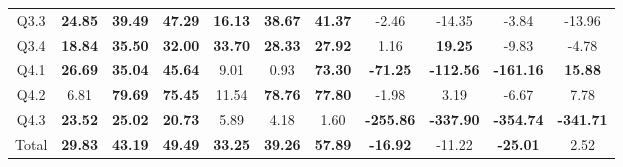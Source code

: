 \begin{table}
{\begin{tabular}{@{}ccccccccccc@{}}
    Q3.3                       & \multicolumn{1}{c}{\textbf{24.85}}            & \multicolumn{1}{c}{\textbf{39.49}}            & \textbf{47.29}            & \multicolumn{1}{c}{\textbf{16.13}}             & \multicolumn{1}{c}{\textbf{38.67}}           & \textbf{41.37}            & \multicolumn{1}{c}{-2.46}            & \multicolumn{1}{c}{-14.35}           & \multicolumn{1}{c}{-3.84}            & -13.96                          \\ 
    Q3.4                       & \multicolumn{1}{c}{\textbf{18.84}}            & \multicolumn{1}{c}{\textbf{35.50}}            & \textbf{32.00}            & \multicolumn{1}{c}{\textbf{33.70}}             & \multicolumn{1}{c}{\textbf{28.33}}           & \textbf{27.92}            & \multicolumn{1}{c}{1.16}             & \multicolumn{1}{c}{\textbf{19.25}}   & \multicolumn{1}{c}{-9.83}            & -4.78                           \\ 
    Q4.1                       & \multicolumn{1}{c}{\textbf{26.69}}            & \multicolumn{1}{c}{\textbf{35.04}}            & \textbf{45.64}            & \multicolumn{1}{c}{9.01}                       & \multicolumn{1}{c}{0.93}                     & \textbf{73.30}            & \multicolumn{1}{c}{\textbf{-71.25}}  & \multicolumn{1}{c}{\textbf{-112.56}} & \multicolumn{1}{c}{\textbf{-161.16}} & \textbf{15.88}                  \\ 
    Q4.2                       & \multicolumn{1}{c}{6.81}                      & \multicolumn{1}{c}{\textbf{79.69}}            & \textbf{75.45}            & \multicolumn{1}{c}{11.54}                      & \multicolumn{1}{c}{\textbf{78.76}}           & \textbf{77.80}            & \multicolumn{1}{c}{-1.98}            & \multicolumn{1}{c}{3.19}             & \multicolumn{1}{c}{-6.67}            & 7.78                            \\ 
    Q4.3                       & \multicolumn{1}{c}{\textbf{23.52}}            & \multicolumn{1}{c}{\textbf{25.02}}            & \textbf{20.73}            & \multicolumn{1}{c}{5.89}                       & \multicolumn{1}{c}{4.18}                     & 1.60                      & \multicolumn{1}{c}{\textbf{-255.86}} & \multicolumn{1}{c}{\textbf{-337.90}} & \multicolumn{1}{c}{\textbf{-354.74}} & \textbf{-341.71}                \\ 
    Total                      & \multicolumn{1}{c}{\textbf{29.83}}            & \multicolumn{1}{c}{\textbf{43.19}}            & \textbf{49.49}            & \multicolumn{1}{c}{\textbf{33.25}}             & \multicolumn{1}{c}{\textbf{39.26}}           & \textbf{57.89}            & \multicolumn{1}{c}{\textbf{-16.92}}  & \multicolumn{1}{c}{-11.22}           & \multicolumn{1}{c}{\textbf{-25.01}}  & 2.52                            \\ \bottomrule
    \end{tabular}%
    }
    \end{table}


